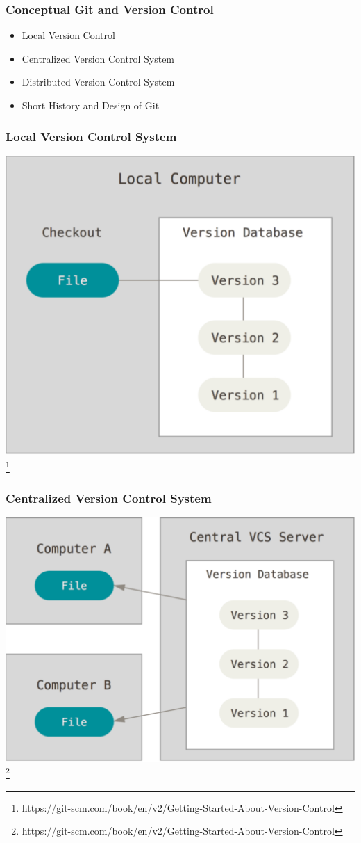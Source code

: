 \begin{frame}
  \frametitle{Conceptual Git and Version Control}
  \begin{itemize}
    \item Local Version Control
    \item Centralized Version Control System
    \item Distributed Version Control System
    \item Short History and Design of Git
  \end{itemize}
\end{frame}

\begin{frame}
  \frametitle{Local Version Control System}
  \centering
  \includegraphics[height=0.80\textheight]{local-vcs}
  \footnote{https://git-scm.com/book/en/v2/Getting-Started-About-Version-Control}
\end{frame}

\begin{frame}
  \frametitle{Centralized Version Control System}
  \centering
  \includegraphics[height=0.80\textheight]{centralized-vcs}
  \footnote{https://git-scm.com/book/en/v2/Getting-Started-About-Version-Control}
\end{frame}

